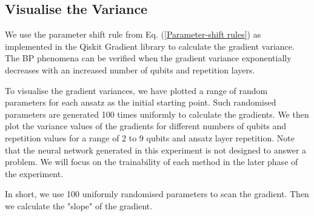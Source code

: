\subsection{Visualise the Variance}
We use the parameter shift rule from Eq. (\ref{Parameter-shift rules}) as implemented in the Qiskit Gradient library to calculate the gradient variance.
The BP phenomena can be verified when the gradient variance exponentially decreases with an increased number of qubits and repetition layers.

To visualise the gradient variances, we have plotted a range of random parameters for each ansatz as the initial starting point.
Such randomised parameters are generated 100 times uniformly to calculate the gradients.
We then plot the variance values of the gradients for different numbers of qubits and repetition values for a range of 2 to 9 qubits and ansatz layer repetition.
Note that the neural network generated in this experiment is not designed to answer a problem. 
We will focus on the trainability of each method in the later phase of the experiment.

In short, we use 100 uniformly randomised parameters to scan the gradient. 
Then we calculate the "slope" of the gradient.